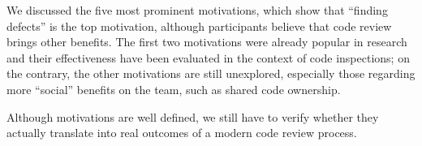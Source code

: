 We discussed the five most prominent motivations, which show that ``finding
defects'' is the top motivation, although participants believe that code review
brings other benefits. The first two motivations were already popular in
research and their effectiveness have been evaluated in the context of code
inspections; on the contrary, the other motivations are still unexplored,
especially those regarding more ``social'' benefits on the team, such as shared
code ownership.

Although motivations are well defined, we still have to verify whether they
actually translate into real outcomes of a modern code review process. 
